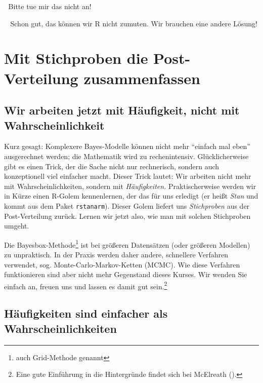 \documentclass[
  ngerman,
  letterpaper,
  twoside,
  open=any]{scrbook}
\theoremstyle{definition}
\theoremstyle{plain}
\theoremstyle{definition}
\theoremstyle{definition}
\theoremstyle{definition}
\theoremstyle{definition}
\theoremstyle{remark}
\begin{document}
\begin{displayquote}
🤖 Bitte tue mir das nicht an!
\end{displayquote}

\begin{displayquote}
👨🏫 Schon gut, das können wir R nicht zumuten. Wir brauchen eine andere
Lösung!
\end{displayquote}

\section{Mit Stichproben die Post-Verteilung
zusammenfassen}\label{mit-stichproben-die-post-verteilung-zusammenfassen}

\subsection{Wir arbeiten jetzt mit Häufigkeit, nicht mit
Wahrscheinlichkeit}\label{wir-arbeiten-jetzt-mit-huxe4ufigkeit-nicht-mit-wahrscheinlichkeit}

Kurz gesagt: Komplexere Bayes-Modelle können nicht mehr \enquote{einfach
mal eben} ausgerechnet werden; die Mathematik wird zu rechenintensiv.
Glücklicherweise gibt es einen Trick, der die Sache nicht nur
rechnerisch, sondern auch konzeptionell viel einfacher macht. Dieser
Trick lautet: Wir arbeiten nicht mehr mit Wahrscheinlichkeiten, sondern
mit \emph{Häufigkeiten.} Praktischerweise werden wir in Kürze einen
R-Golem kennenlernen, der das für uns erledigt (er heißt \emph{Stan} und
kommt aus dem Paket \texttt{rstanarm}). Dieser Golem liefert uns
\emph{Stichproben} aus der Post-Verteilung zurück. Lernen wir jetzt
also, wie man mit solchen Stichproben umgeht.

Die Bayesbox-Methode\footnote{auch Grid-Methode genannt} ist bei
größeren Datensätzen (oder größeren Modellen) zu unpraktisch. In der
Praxis werden daher andere, schnellere Verfahren verwendet, sog.
Monte-Carlo-Markov-Ketten (MCMC). Wie diese Verfahren funktionieren sind
aber nicht mehr Gegenstand dieses Kurses. Wir wenden Sie einfach an,
freuen uns und lassen es damit gut sein.\footnote{Eine gute Einführung
  in die Hintergründe findet sich bei McElreath
  ().}

\subsection{Häufigkeiten sind einfacher als
Wahrscheinlichkeiten}\label{huxe4ufigkeiten-sind-einfacher-als-wahrscheinlichkeiten}
\end{document}
